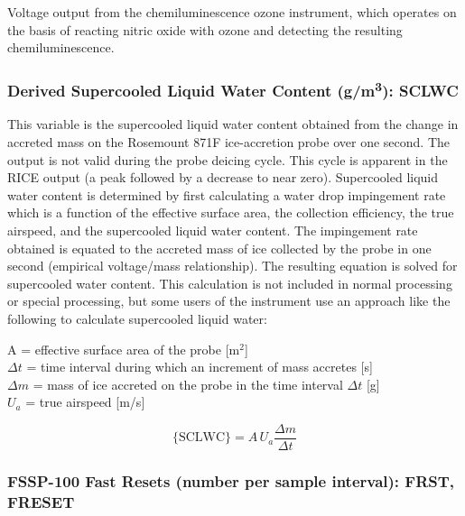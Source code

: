 \documentclass[
]{book}
\begin{document}
Voltage output from the chemiluminescence ozone instrument, which operates on the basis of reacting nitric oxide with ozone and detecting the resulting chemiluminescence.

\hypertarget{SCLWC}{%
\subsubsection*{\texorpdfstring{Derived Supercooled Liquid Water Content (g/m\textsuperscript{3}): SCLWC}{Derived Supercooled Liquid Water Content (g/m3): SCLWC}}\label{SCLWC}}

This variable is the supercooled liquid water content obtained from the change in accreted mass on the Rosemount 871F ice-accretion probe over one second. The output is not valid during the probe deicing cycle. This cycle is apparent in the RICE output (a peak followed by a decrease to near zero). Supercooled liquid water content is determined by first calculating a water drop impingement rate which is a function of the effective surface area, the collection efficiency, the true airspeed, and the supercooled liquid water content. The impingement rate obtained is equated to the accreted mass of ice collected by the probe in one second (empirical voltage/mass relationship). The resulting equation is solved for supercooled water content. This calculation is not included in normal processing or special processing, but some users of the instrument use an approach like the following to calculate supercooled liquid water:

A = effective surface area of the probe {[}m\(^{2}\){]}\\
\(\Delta t\) = time interval
during which an increment of mass accretes {[}s{]}\\
\(\Delta m\) = mass of ice accreted on the
probe in the time interval \(\Delta t\) {[}g{]}\\
\(U_{a}\) = true airspeed {[}m/s{]}

\begin{equation}
\mathrm{\{SCLWC\}}=A\,U_{a}\frac{\Delta m}{\Delta t}
\label{eq:SCLWCbox}
\end{equation}

\hypertarget{freset}{%
\subsubsection*{FSSP-100 Fast Resets (number per sample interval): FRST, FRESET}\label{freset}}
\end{document}
